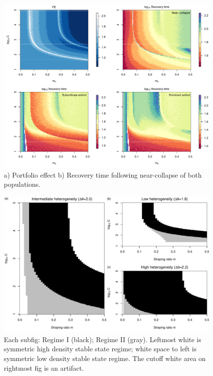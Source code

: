 \documentclass{revtex4}
\begin{document}
\begin{figure}
  \captionsetup{justification=raggedright,
singlelinecheck=false
}
\centering
\includegraphics[width=1\textwidth]{fig_rtpe_ddm.pdf}
\caption{
a) Portfolio effect
b) Recovery time following near-collapse of both populations.
} \label{fig:pert}
\end{figure}


\begin{figure}
  \captionsetup{justification=raggedright,
singlelinecheck=false
}
\centering
\includegraphics[width=1\textwidth]{fig_hysteresis_ddm_theta.pdf}
\caption{
Each subfig: Regime I (black); Regime II (gray). Leftmost white is symmetric high density stable state regime; white space to left is symmetric low density stable state regime. The cutoff white area on rightmost fig is an artifact.
} \label{fig:hystheta}
\end{figure}
\end{document}
